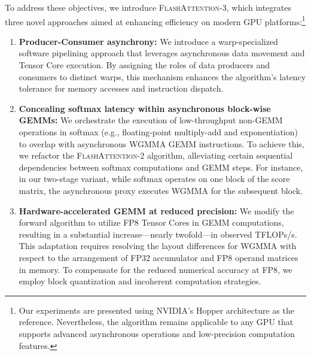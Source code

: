 To address these objectives, we introduce \textsc{FlashAttention-3}, which integrates three novel approaches aimed at enhancing efficiency on modern GPU platforms:\footnote{Our experiments are presented using NVIDIA's Hopper architecture as the reference. Nevertheless, the algorithm remains applicable to any GPU that supports advanced asynchronous operations and low-precision computation features.}

\begin{enumerate}

\item \textbf{Producer-Consumer asynchrony:} We introduce a warp-specialized software pipelining approach that leverages asynchronous data movement and Tensor Core execution. By assigning the roles of data producers and consumers to distinct warps, this mechanism enhances the algorithm's latency tolerance for memory accesses and instruction dispatch.
\item \textbf{Concealing softmax latency within asynchronous block-wise GEMMs:} We orchestrate the execution of low-throughput non-GEMM operations in softmax (e.g., floating-point multiply-add and exponentiation) to overlap with asynchronous WGMMA GEMM instructions. To achieve this, we refactor the \textsc{FlashAttention-2} algorithm, alleviating certain sequential dependencies between softmax computations and GEMM steps. For instance, in our two-stage variant, while softmax operates on one block of the score matrix, the asynchronous proxy executes WGMMA for the subsequent block.
\item \textbf{Hardware-accelerated GEMM at reduced precision:} We modify the forward algorithm to utilize FP8 Tensor Cores in GEMM computations, resulting in a substantial increase—nearly twofold—in observed TFLOPs/s. This adaptation requires resolving the layout differences for WGMMA with respect to the arrangement of FP32 accumulator and FP8 operand matrices in memory. To compensate for the reduced numerical accuracy at FP8, we employ block quantization and incoherent computation strategies.
\end{enumerate}

